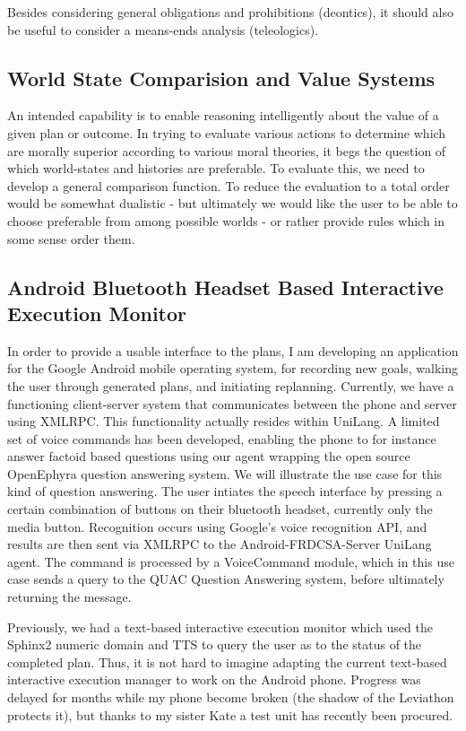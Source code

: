 \documentclass[letterpaper]{article}
\begin{document}
Besides considering general obligations and prohibitions (deontics),
it should also be useful to consider a means-ends analysis
(teleologics).

\subsection{World State Comparision and Value Systems}

\noindent An intended capability is to enable reasoning intelligently
about the value of a given plan or outcome.  In trying to evaluate
various actions to determine which are morally superior according to
various moral theories, it begs the question of which world-states and
histories are preferable.  To evaluate this, we need to develop a
general comparison function.  To reduce the evaluation to a total
order would be somewhat dualistic - but ultimately we would like the
user to be able to choose preferable from among possible worlds - or
rather provide rules which in some sense order them.

\subsection{Android Bluetooth Headset Based Interactive Execution Monitor}

\noindent In order to provide a usable interface to the plans, I am
developing an application for the Google Android mobile operating
system, for recording new goals, walking the user through generated
plans, and initiating replanning.  Currently, we have a functioning
client-server system that communicates between the phone and server
using XMLRPC.  This functionality actually resides within UniLang.  A
limited set of voice commands has been developed, enabling the phone
to for instance answer factoid based questions using our agent
wrapping the open source OpenEphyra question answering system.  We
will illustrate the use case for this kind of question answering.  The
user intiates the speech interface by pressing a certain combination
of buttons on their bluetooth headset, currently only the media
button.  Recognition occurs using Google's voice recognition API, and
results are then sent via XMLRPC to the Android-FRDCSA-Server UniLang
agent.  The command is processed by a VoiceCommand module, which in
this use case sends a query to the QUAC Question Answering system,
before ultimately returning the message.

Previously, we had a text-based interactive execution monitor which
used the Sphinx2 numeric domain and TTS to query the user as to the
status of the completed plan.  Thus, it is not hard to imagine
adapting the current text-based interactive execution manager to work
on the Android phone.  Progress was delayed for months while my phone
become broken (the shadow of the Leviathon protects it), but thanks to
my sister Kate a test unit has recently been procured.
\end{document}

